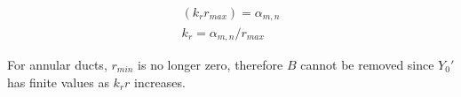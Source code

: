 \begin{align}
    (k_r r_{max})  = \alpha_{m,n} \\
    k_r = \alpha_{m,n}/r_{max}
\end{align}

For annular ducts, $r_{min}$ is no longer zero, therefore $B$ cannot be removed
since $Y_0'$ has finite values as $k_r r $ increases.
%
%
%
%
%
%
%
%
%
%
%
%
%
%
%
%
